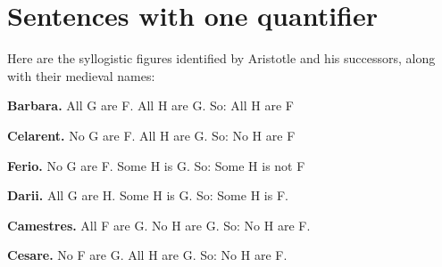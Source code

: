 

\chapter{Sentences with one quantifier}\label{s:MoreMonadic}\setcounter{ProbPart}{0}
\problempart
\label{pr.BarbaraEtc}
Here are the syllogistic figures identified by Aristotle and his successors, along with their medieval names:
\begin{earg}
	\item \textbf{Barbara.} All G are F. All H are G. So:  All H are F
	\item[] 
	\item \textbf{Celarent.} No G are F. All H are G. So: No H are F
	\item[] 
	\item \textbf{Ferio.} No G are F. Some H is G. So: Some H is not F
	\item[] 
	\item \textbf{Darii.} All G are H. Some H is G. So: Some H is F.
	\item[] 
	\item \textbf{Camestres.} All F are G. No H are G. So: No H are F.
	\item[] 
	\item \textbf{Cesare.} No F are G. All H are G. So: No H are F.
	\item[] 

\end{earg}

